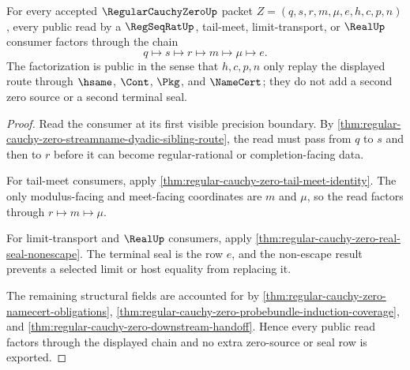 \begin{theorem}
\label{thm:regular-cauchy-zero-public-consumer-factorization}
For every accepted $\RegularCauchyZeroUp$ packet $Z=(q,s,r,m,\mu,e,h,c,p,n)$, every public read by a $\RegSeqRatUp$, tail-meet, limit-transport, or $\RealUp$ consumer factors through the chain
$$
q \mapsto s \mapsto r \mapsto m \mapsto \mu \mapsto e.
$$
The factorization is public in the sense that $h,c,p,n$ only replay the displayed route through $\hsame$, $\Cont$, $\Pkg$, and $\NameCert$; they do not add a second zero source or a second terminal seal.
\end{theorem}
\begin{proof}
Read the consumer at its first visible precision boundary. By \autoref{thm:regular-cauchy-zero-streamname-dyadic-sibling-route}, the read must pass from $q$ to $s$ and then to $r$ before it can become regular-rational or completion-facing data.

For tail-meet consumers, apply \autoref{thm:regular-cauchy-zero-tail-meet-identity}. The only modulus-facing and meet-facing coordinates are $m$ and $\mu$, so the read factors through $r \mapsto m \mapsto \mu$.

For limit-transport and $\RealUp$ consumers, apply \autoref{thm:regular-cauchy-zero-real-seal-nonescape}. The terminal seal is the row $e$, and the non-escape result prevents a selected limit or host equality from replacing it.

The remaining structural fields are accounted for by \autoref{thm:regular-cauchy-zero-namecert-obligations}, \autoref{thm:regular-cauchy-zero-probebundle-induction-coverage}, and \autoref{thm:regular-cauchy-zero-downstream-handoff}. Hence every public read factors through the displayed chain and no extra zero-source or seal row is exported.
\end{proof}

